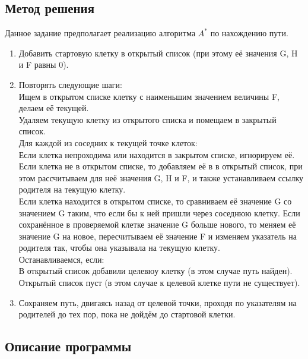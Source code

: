 \documentclass[12pt]{article}
\begin{document}
\subsection*{Метод решения}

Данное задание предполагает реализацию алгоритма $A^{*}$ по нахождению пути.

\begin{enumerate}
    \item Добавить стартовую клетку в открытый список (при этому её значения G, H и F равны 0).
    \item Повторять следующие шаги:\\
    Ищем в открытом списке клетку с наименьшим значением величины F, делаем её текущей.\\
    Удаляем текущую клетку из открытого списка и помещаем в закрытый список.\\
    Для каждой из соседних к текущей точке клеток:\\
    Если клетка непроходима или находится в закрытом списке, игнорируем её.\\
    Если клетка не в открытом списке, то добавляем её в в открытый список, при этом рассчитываем для неё значения G, H и F, и также устанавливаем ссылку родителя на текущую клетку.\\
    Если клетка находится в открытом списке, то сравниваем её значение G со значением G таким, что если бы к ней пришли через соседнюю клетку. Если сохранённое в проверяемой клетке значение G больше нового, то меняем её значение G на новое, пересчитываем её значение F и изменяем указатель на родителя так, чтобы она указывала на текущую клетку.\\
    Останавливаемся, если:\\
    В открытый список добавили целевюу клетку (в этом случае путь найден). Открытый список пуст (в этом случае к целевой клетке пути не существует).
    \item Сохраняем путь, двигаясь назад от целевой точки, проходя по указателям на родителей до тех пор, пока не дойдём до стартовой клетки.
\end{enumerate}

\subsection*{Описание программы}
\end{document}
